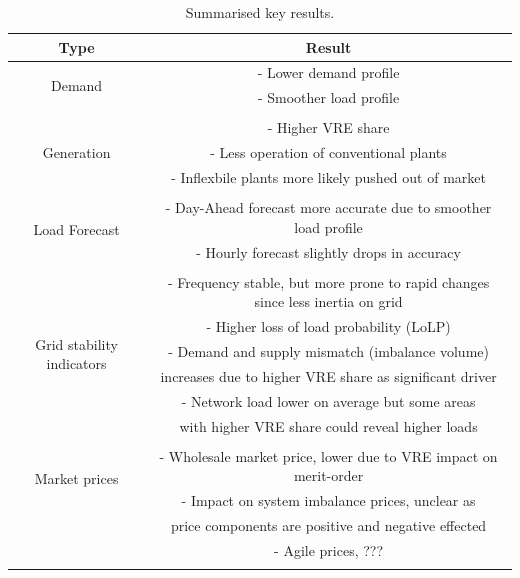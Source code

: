 \documentclass[energies,article,submit,moreauthors,pdftex]{Definitions/mdpi}
\begin{document}
\begin{table}[H]
\caption{Summarised key results.
}\label{table:Summary key results}
\centering
\begin{tabular}{cc}
\toprule
\textbf{Type} & \textbf{Result}	\\
\midrule

\multirow{2}{10em}{Demand}
& - Lower demand profile \\ 
& - Smoother load profile\\\\

\multirow{3}{10em}{Generation} 
& - Higher VRE share \\ 
& - Less operation of conventional plants \\ 
& - Inflexbile plants more likely pushed out of market \\\\

\multirow{2}{10em}{Load Forecast} 
& - Day-Ahead forecast more accurate due to smoother load profile \\
& - Hourly forecast slightly drops in accuracy  \\\\

\multirow{6}{10em}{Grid stability indicators} 
& - Frequency stable, but more prone to rapid changes since less inertia on grid \\
& - Higher loss of load probability (LoLP)\\
& - Demand and supply mismatch (imbalance volume) \\
& increases due to higher VRE share as significant 
driver \\ 
& - Network load lower on average but some areas \\
& with higher VRE share could reveal higher loads\\\\ 


\multirow{2}{10em}{Market prices} 
& - Wholesale market price, lower due to VRE impact on merit-order \\ 
& - Impact on system imbalance prices, unclear as \\
&price components are positive and negative effected \\ 
& - Agile prices, ???\\\\ 



\bottomrule
\end{tabular}
\end{table}
\end{document}
